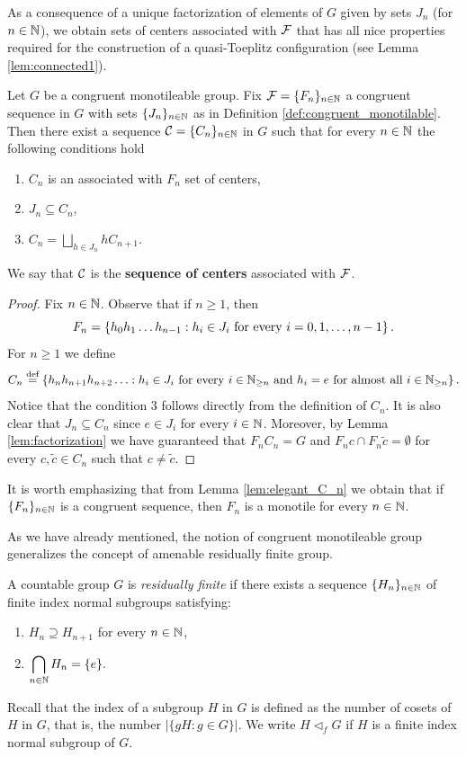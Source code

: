 \noindent
As a consequence of a unique factorization of elements of $G$ given by sets $J_n$ (for $n\in\mathbb{N}$), we obtain sets of centers associated with $\operatorname{\mathcal{F}}$ that has all nice properties required for the construction of a quasi-Toeplitz configuration (see Lemma \ref{lem:connected1}).

\begin{lem}\label{lem:elegant_C_n}
Let $G$ be a congruent monotileable group. Fix  $\operatorname{\mathcal{F}}=\{F_n\}_{n\in\mathbb{N}}$ a congruent \Folner sequence in $G$ with sets $\{J_n\}_{n\in\mathbb{N}}$ as in Definition \ref{def:congruent_monotilable}. Then there exist a sequence $\operatorname{\mathcal{C}}=\{C_n\}_{n\in\mathbb{N}}$ in $G$ such that for every $n\in\mathbb{N}$ the following conditions hold
\begin{enumerate}
\item $C_n$ is an associated with $F_n$ set of centers,
\item $J_n\subseteq C_n$,
\item $\displaystyle C_n=\bigsqcup_{h\in J_n}hC_{n+1}$.
\end{enumerate}
We say that $\operatorname{\mathcal{C}}$ is the {\bf \elegant sequence of centers} associated with $\operatorname{\mathcal{F}}$.
\end{lem}

\begin{proof}
Fix $n\in\mathbb{N}$. Observe that if $n\geq 1$, then
\[
F_n = \left\{h_0h_1\ldots h_{n-1}: h_i\in J_i \text{ for every } i=0,1,\ldots,n-1 \right\}.
\]
For $n\geq 1$ we define
\[
C_n\stackrel{\textup{def}}{=}\left\{h_nh_{n+1}h_{n+2}\ldots: h_i\in J_i \text{ for every } i\in\mathbb{N}_{\geq n} \text{ and } h_i=e \text{ for almost all } i\in\mathbb{N}_{\geq n} \right\}.
\]
Notice that the condition $3$ follows directly from the definition of $C_n$. It is also clear that $J_n\subseteq C_n$ since $e\in J_i$ for every $i\in\mathbb{N}$. Moreover, by Lemma \ref{lem:factorization} we have guaranteed that $F_nC_n=G$ and $F_nc\cap F_n \tilde{c}=\emptyset$ for every $c,\tilde{c}\in C_n$ such that $c\neq\tilde{c}$.
\end{proof}

\noindent
It is worth emphasizing that from Lemma \ref{lem:elegant_C_n} we obtain that if $\{F_n\}_{n\in\mathbb{N}}$ is a congruent \Folner sequence, then $F_n$ is a monotile for every $n\in\mathbb{N}$.

As we have already mentioned, the notion of congruent monotileable group generalizes the concept of amenable residually finite group.

\begin{defn}\label{def:res_fin}
A countable group $G$ is \emph{residually finite} if there exists a sequence $\{H_n\}_{n\in \mathbb{N}}$ of finite index normal subgroups satisfying:
\begin{enumerate}
\item $H_n\supseteq H_{n+1}$ for every $n\in\mathbb{N}$,
\item $\displaystyle \bigcap_{n\in\mathbb{N}} H_n = \{e\}.$
\end{enumerate}  
\end{defn}
\noindent
Recall that the index of a subgroup $H$ in $G$ is defined as the number of cosets of $H$ in $G$, that is, the number $|\{gH:g\in G\}|$. We write $H\triangleleft_f G$ if $H$ is a finite index normal subgroup of $G$.


